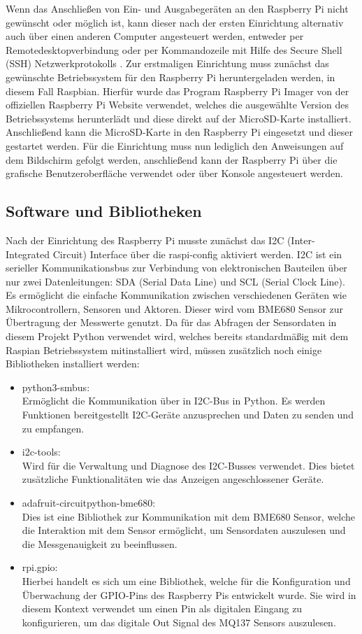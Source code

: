 \documentclass[conference]{IEEEtran}
\begin{document}
Wenn das Anschließen von Ein- und Ausgabegeräten an den Raspberry Pi nicht gewünscht oder möglich ist, kann dieser nach der ersten Einrichtung alternativ auch über einen anderen Computer angesteuert werden, entweder per Remotedesktopverbindung oder per Kommandozeile mit Hilfe des Secure Shell (SSH) Netzwerkprotokolls \cite{raspy}. Zur erstmaligen Einrichtung muss zunächst das gewünschte Betriebssystem für den Raspberry Pi heruntergeladen werden, in diesem Fall Raspbian. Hierfür wurde das Program Raspberry Pi Imager von der offiziellen Raspberry Pi Website verwendet, welches die ausgewählte Version des Betriebssystems herunterlädt und diese direkt auf der MicroSD-Karte installiert. Anschließend kann die MicroSD-Karte in den Raspberry Pi eingesetzt und dieser gestartet werden. Für die Einrichtung muss nun lediglich den Anweisungen auf dem Bildschirm gefolgt werden, anschließend kann der Raspberry Pi über die grafische Benutzeroberfläche verwendet oder über Konsole angesteuert werden.  


\subsection{Software und Bibliotheken}
Nach der Einrichtung des Raspberry Pi musste zunächst das I2C (Inter-Integrated Circuit) Interface über die raspi-config aktiviert werden. I2C  ist ein serieller Kommunikationsbus zur Verbindung von elektronischen Bauteilen über nur zwei Datenleitungen: SDA (Serial Data Line) und SCL (Serial Clock Line). Es ermöglicht die einfache Kommunikation zwischen verschiedenen Geräten wie Mikrocontrollern, Sensoren und Aktoren. Dieser wird vom BME680 Sensor zur Übertragung der Messwerte genutzt. Da für das Abfragen der Sensordaten in diesem Projekt Python verwendet wird, welches bereits standardmäßig mit dem Raspian Betriebssystem mitinstalliert wird, müssen zusätzlich noch einige Bibliotheken installiert werden: 
\begin{itemize}
	\item python3-smbus: \\
	Ermöglicht die Kommunikation über in I2C-Bus in Python. Es werden Funktionen bereitgestellt I2C-Geräte anzusprechen und Daten zu senden und zu empfangen.
	\item i2c-tools: \\
	 Wird für die Verwaltung und Diagnose des I2C-Busses verwendet. Dies bietet zusätzliche Funktionalitäten wie das Anzeigen angeschlossener Geräte.
	\item adafruit-circuitpython-bme680: \\
	Dies ist eine Bibliothek zur Kommunikation mit dem BME680 Sensor, welche die Interaktion mit dem Sensor ermöglicht, um Sensordaten auszulesen und die Messgenauigkeit zu beeinflussen.
	\item rpi.gpio: \\
	Hierbei handelt es sich um eine Bibliothek, welche für die Konfiguration und Überwachung der GPIO-Pins des Raspberry Pis entwickelt wurde. Sie wird in diesem Kontext verwendet um einen Pin als digitalen Eingang zu konfigurieren, um das digitale Out Signal des MQ137 Sensors auszulesen.
\end{itemize}
\end{document}
